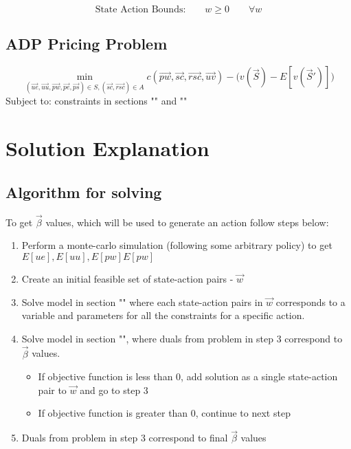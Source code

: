 \begin{equation}
	\text{State Action Bounds:} \qquad w \ge 0 \qquad \forall w
\end{equation}


\subsection{ADP Pricing Problem}
\label{Pricing Problem}
\begin{equation}
	\min_{(\vec{ue}, \vec{uu}, \vec{pw}, \vec{pe}, \vec{ps}) \in S,  (\vec{sc}, \vec{rsc}) \in A } c(\vec{pw},\vec{sc},\vec{rsc},\vec{uv}) - \Big(v(\vec{S}) - E[v(\vec{S}')] \Big)
\end{equation}
Subject to:
constraints in sections "" and ""

\section{Solution Explanation}
\subsection{Algorithm for solving}
To get $\vec{\beta}$ values, which will be used to generate an action follow steps below:
\begin{enumerate}
	\item Perform a monte-carlo simulation (following some arbitrary policy) to get $E[ue], E[uu], E[pw] E[pw]$
	\item Create an initial feasible set of state-action pairs - $\vec{w}$
	\item Solve model in section "" where each state-action pairs in $\vec{w}$ corresponds to a variable and parameters for all the constraints for a specific action.
	\item Solve model in section "", where duals from problem in step 3  correspond to $\vec{\beta}$ values. 
	\begin{itemize}
		\item If objective function is less than 0, add solution as a single state-action pair to $\vec{w}$ and go to step 3
		\item If objective function is greater than 0, continue to next step
	\end{itemize}
	\item Duals from problem in step 3 correspond to final $\vec{\beta}$ values
\end{enumerate}

